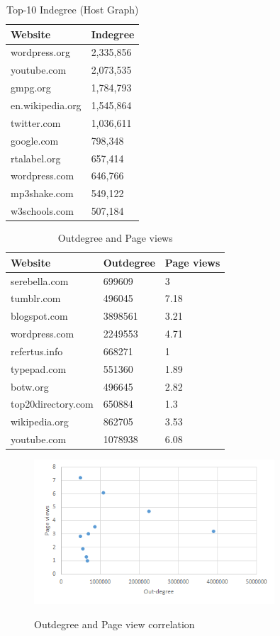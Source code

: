 \begin{table}[H]
	\caption{Top-10 Indegree (Host Graph)}
	\label{t4a}
	\begin{center}
		\begin{tabular}{|l|l|}
			\hline
			Website	&Indegree \\ \hline
			wordpress.org	&2,335,856 \\ \hline
			youtube.com	&2,073,535 \\ \hline
			gmpg.org	&1,784,793 \\ \hline
			en.wikipedia.org	&1,545,864 \\ \hline
			twitter.com	&1,036,611 \\ \hline
			google.com	&798,348 \\ \hline
			rtalabel.org	&657,414 \\ \hline
			wordpress.com	&646,766 \\ \hline
			mp3shake.com	&549,122 \\ \hline
			w3schools.com	&507,184 \\ \hline
		\end{tabular}
	\end{center}
\end{table}

\begin{table}[H]
	\caption{Outdegree and Page views}
	\label{t4}
	\begin{center}
		\begin{tabular}{|l|l|l|}
			\hline
			Website	&Outdegree	&Page views \\ \hline
			serebella.com	&699609	&3 \\ \hline
			tumblr.com	&496045	&7.18 \\ \hline
			blogspot.com	&3898561	&3.21 \\ \hline
			wordpress.com	&2249553	&4.71 \\ \hline
			refertus.info	&668271	&1 \\ \hline
			typepad.com	&551360	&1.89 \\ \hline
			botw.org	&496645	&2.82 \\ \hline
			top20directory.com	&650884	&1.3 \\ \hline
			wikipedia.org	&862705	&3.53 \\ \hline	
			youtube.com	&1078938	&6.08 \\ \hline			
		\end{tabular}
	\end{center}
\end{table}

\begin{figure}[H]	
	\begin{center}
		\label{fig1&}		
		\includegraphics[width=0.8\textwidth]{fig16}	
		\caption{Outdegree and Page view correlation}	
	\end{center}
\end{figure}